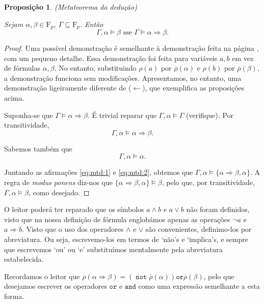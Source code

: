 \documentclass{report}
\newtheorem{prop}{Proposição}
\theoremstyle{definition}
\theoremstyle{remark}
\newcommand{\F}{\mathrm{F}}
\DeclareMathOperator{\pnot}{\texttt{not}}
\newcommand{\pand}{\mathbin{\texttt{and}}}
\newcommand{\por}{\mathbin{\texttt{or}}}
\newcommand{\imply}{\mathbin{\Rightarrow}}
\begin{document}
	\begin{prop}
	(Metateorema da dedução)
	
	Sejam $\alpha, \beta \in \F_p$, $\Gamma \subseteq \F_p$. Então
	\[\Gamma, \alpha \vDash \beta \text{ sse } \Gamma \vDash \alpha \imply \beta.\]
	\end{prop}
	
	\begin{proof}
	Uma possível demonstração é semelhante à demonstração feita na página \pageref{dem:mtd}, com um pequeno detalhe. Essa demonstração foi feita para variáveis $a, b$ em vez de fórmulas $\alpha, \beta$. No entanto, substituindo $\rho(a)$ por $\overline\rho(\alpha)$ e $\rho(b)$ por $\overline\rho(\beta)$, a demonstração funciona sem modificações. Apresentamos, no entanto, uma demonstração ligeiramente diferente de ($\leftarrow$), que exemplifica as proposições acima.
	
	Suponha-se que $\Gamma \vDash \alpha \imply \beta$. É trivial reparar que $\Gamma, \alpha \vDash \Gamma$ (verifique). Por transitividade,
	\begin{equation}\label{eq:mtd:1}
	\Gamma, \alpha \vDash \alpha \imply \beta.
	\end{equation}
	
	Sabemos também que
	\begin{equation}\label{eq:mtd:2}
	\Gamma, \alpha \vDash \alpha.
	\end{equation}
	
	Juntando as afirmações \eqref{eq:mtd:1} e \eqref{eq:mtd:2}, obtemos que $\Gamma, \alpha \vDash \{\alpha \imply \beta, \alpha\}$. A regra de \textit{modus ponens} diz-nos que $\{\alpha \imply \beta, \alpha\} \vDash \beta$, pelo que, por transitividade, $\Gamma, \alpha \vDash \beta$, como desejado.
	\end{proof}
	
	O leitor poderá ter reparado que os símbolos $a \land b$ e $a \lor b$ não foram definidos, visto que na nossa definição de fórmula englobámos apenas as operações $\neg a$ e $a \imply b$. Visto que o uso dos operadores $\land$ e $\lor$ são convenientes, definimo-los por abreviatura. Ou seja, escrevemo-los em termos de `não's e `implica's, e sempre que escrevemos `ou' ou `e' substituímos mentalmente pela abreviatura estabelecida.
	
	Recordamos o leitor que $\overline\rho(\alpha \imply \beta) = (\pnot \overline\rho(\alpha)) \por \overline\rho(\beta)$, pelo que desejamos escrever os operadores $\por$ e $\pand$ como uma expressão semelhante a esta forma.
	
\end{document}
